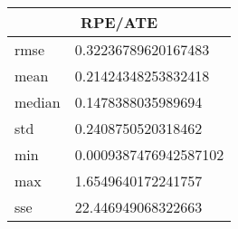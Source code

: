 \begin{table}[!ht] 
 \centering 
 \begin{tabular}{|l|l|} \hline 
 \multicolumn{2}{|c|}{RPE/ATE} \\ \hline 
 rmse & 0.32236789620167483 \\ \hline 
mean & 0.21424348253832418 \\ \hline 
median & 0.1478388035989694 \\ \hline 
std & 0.2408750520318462 \\ \hline 
min & 0.0009387476942587102 \\ \hline 
max & 1.6549640172241757 \\ \hline 
sse & 22.446949068322663 \\ \hline 
\end{tabular} 
 \end{table}